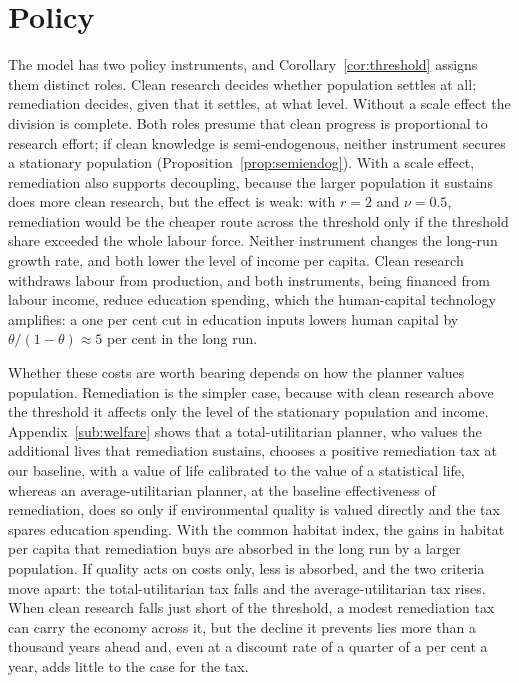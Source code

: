 \documentclass[11pt]{article}
\begin{document}
\section{Policy}
\label{sec:policy}

The model has two policy instruments, and Corollary~\ref{cor:threshold} assigns them distinct roles.
Clean research decides whether population settles at all; remediation decides, given that it settles, at
what level. Without a scale effect the division is complete. Both roles presume that clean progress is
proportional to research effort; if clean knowledge is semi-endogenous, neither instrument secures a
stationary population (Proposition~\ref{prop:semiendog}). With a scale effect, remediation also supports
decoupling, because the larger population it sustains does more clean research, but the effect is
weak: with $r=2$ and $\nu=0.5$, remediation would be the cheaper route across the threshold only if the
threshold share exceeded the whole labour force. Neither instrument changes the long-run growth rate,
and both lower the level of income per capita. Clean research withdraws labour from production, and
both instruments, being financed from labour income, reduce education spending, which the
human-capital technology amplifies: a one per cent cut in education inputs lowers human capital by
$\theta/(1-\theta)\approx5$ per cent in the long run.

Whether these costs are worth bearing depends on how the planner values population. Remediation is the
simpler case, because with clean research above the threshold it affects only the level of the
stationary population and income. Appendix~\ref{sub:welfare} shows that a total-utilitarian
planner, who values the additional lives that remediation sustains, chooses a positive remediation tax at
our baseline, with a value of life calibrated to the value of a statistical life, whereas an
average-utilitarian planner, at the baseline effectiveness of remediation, does so only if environmental
quality is valued directly and the tax spares education spending. With the common
habitat index, the gains in habitat per capita that remediation buys are absorbed in the long run by a
larger population. If quality acts on costs only, less is absorbed, and the two criteria move apart: the
total-utilitarian tax falls and the average-utilitarian tax rises. When clean
research falls just short of the threshold, a modest remediation tax can carry the economy across it, but
the decline it prevents lies more than a thousand years ahead and, even at a discount rate of a quarter of a
per cent a year, adds little to the case for the tax.
\end{document}

